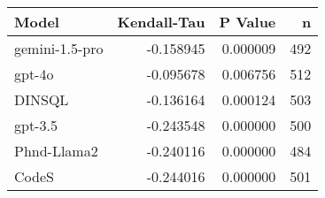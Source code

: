 \begin{tabular}{lrrr}
\toprule
Model & Kendall-Tau & P Value & n \\
\midrule
gemini-1.5-pro & -0.158945 & 0.000009 & 492 \\
gpt-4o & -0.095678 & 0.006756 & 512 \\
DINSQL & -0.136164 & 0.000124 & 503 \\
gpt-3.5 & -0.243548 & 0.000000 & 500 \\
Phnd-Llama2 & -0.240116 & 0.000000 & 484 \\
CodeS & -0.244016 & 0.000000 & 501 \\
\bottomrule
\end{tabular}
